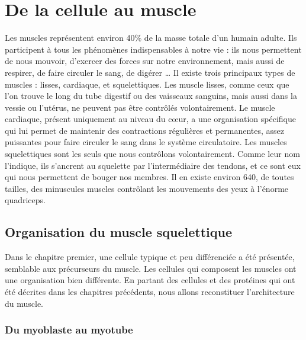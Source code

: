 %
%
%
%
\chapter{De la cellule au muscle}

Les muscles représentent environ 40\% de la masse totale d'un humain adulte. Ils participent à tous les phénomènes indispensables à notre vie : ils nous permettent de nous mouvoir, d'exercer des forces sur notre environnement, mais aussi de respirer, de faire circuler le sang, de digérer \dots 
Il existe trois principaux types de muscles : lisses, cardiaque, et squelettiques. Les muscle lisses, comme ceux que l'on trouve le long du tube digestif ou des vaisseaux sanguins, mais aussi dans la vessie ou l'utérus, ne peuvent pas être contrôlés volontairement. 
Le muscle cardiaque, présent uniquement au niveau du c\oe ur, a une organisation spécifique qui lui permet de maintenir des contractions régulières et permanentes, assez puissantes pour faire circuler le sang dans le système circulatoire. 
Les muscles squelettiques sont les seuls que nous contrôlons volontairement. Comme leur nom l'indique, ils s'ancrent au squelette par l'intermédiaire des tendons, et ce sont eux qui nous permettent de bouger nos membres.  
Il en existe environ 640, de toutes tailles, des minuscules muscles contrôlant les mouvements des yeux à l'énorme quadriceps.

\section{Organisation du muscle squelettique}

Dans le chapitre premier, une cellule typique et peu différenciée a été présentée, semblable aux précurseurs du muscle. Les cellules qui composent les muscles ont une organisation bien différente. 
En partant des cellules et des protéines qui ont été décrites dans les chapitres précédents, nous allons reconstituer l'architecture du muscle. 

\subsection{Du myoblaste au myotube}

